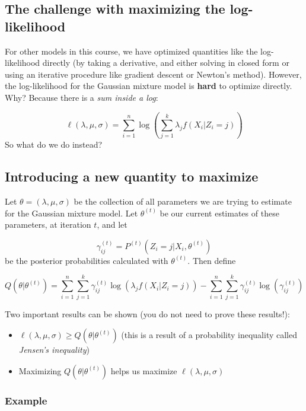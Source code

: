 \documentclass[12pt]{article}
\begin{document}
\newpage

\subsection*{The challenge with maximizing the log-likelihood}

For other models in this course, we have optimized quantities like the log-likelihood directly (by taking a derivative, and either solving in closed form or using an iterative procedure like gradient descent or Newton's method). However, the log-likelihood for the Gaussian mixture model is \textbf{hard} to optimize directly.\\

Why? Because there is a \textit{sum inside a log}:

$$\ell(\lambda, \mu, \sigma) = \sum \limits_{i=1}^n \log \left( \sum \limits_{j=1}^k \lambda_j f(X_i | Z_i = j) \right)$$
So what do we do instead?

\subsection*{Introducing a new quantity to maximize}

Let $\theta = (\lambda, \mu, \sigma)$ be the collection of all parameters we are trying to estimate for the Gaussian mixture model. Let $\theta^{(t)}$ be our current estimates of these parameters, at iteration $t$, and let

$$\gamma_{ij}^{(t)} = P^{(t)}(Z_i = j | X_i, \theta^{(t)})$$
be the posterior probabilities calculated with $\theta^{(t)}$. Then define

$$Q(\theta | \theta^{(t)}) = \sum \limits_{i=1}^n \sum \limits_{j=1}^k \gamma_{ij}^{(t)} \log (\lambda_j f(X_i | Z_i = j)) - \sum \limits_{i=1}^n \sum \limits_{j=1}^k \gamma_{ij}^{(t)} \log(\gamma_{ij}^{(t)})$$

Two important results can be shown (you do not need to prove these results!):

\begin{itemize}
\item $\ell(\lambda, \mu, \sigma) \geq Q(\theta | \theta^{(t)})$ (this is a result of a probability inequality called \textit{Jensen's inequality})

\item Maximizing $Q(\theta | \theta^{(t)})$ helps us maximize $\ell(\lambda, \mu, \sigma)$
\end{itemize}

\subsubsection*{Example}
\end{document}
